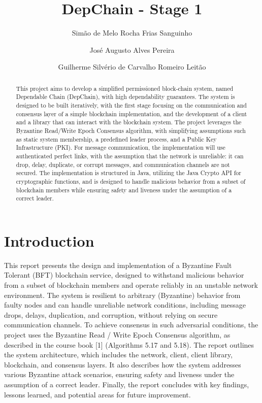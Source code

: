 \documentclass[runningheads]{llncs}
\begin{document}
%
\title{DepChain - Stage 1}
%
%
\author{Simão de Melo Rocha Frias Sanguinho \and José
Augusto Alves Pereira \and Guilherme Silvério de
Carvalho Romeiro Leitão}
%
%
%
\maketitle              %
%
\begin{abstract}
This project aims to develop a simplified permissioned block-chain system, named
Dependable Chain (DepChain), with high dependability guarantees. The system is
designed to be built iteratively, with the first stage focusing on the
communication and consensus layer of a simple blockchain implementation, and the
development of a client and a library that can interact with the blockchain
system. The project leverages the Byzantine Read/Write Epoch Consensus
algorithm, with simplifying assumptions such as static system membership, a
predefined leader process, and a Public Key Infrastructure (PKI). For message
communication, the implementation will use authenticated perfect links, with the
assumption that the  network  is  unreliable:  it  can  drop,  delay, duplicate,
or  corrupt messages, and communication channels are not secured. The
implementation is structured in Java, utilizing the Java Crypto API for
cryptographic functions, and is designed to handle malicious behavior from a
subset of blockchain members while ensuring safety and liveness under the
assumption of a correct leader.
%
\end{abstract}
%
\section{Introduction}
This report presents the design and implementation of a Byzantine Fault Tolerant
(BFT) blockchain service, designed to withstand malicious behavior from a subset
of blockchain members and operate reliably in an unstable network environment.
The system is resilient to arbitrary (Byzantine) behavior from faulty nodes and
can handle unreliable network conditions, including message drops, delays,
duplication, and corruption, without relying on secure communication channels.
To achieve consensus in such adversarial conditions, the project uses the
Byzantine Read / Write Epoch Consensus algorithm, as described in the course
book [1] (Algorithms 5.17 and 5.18). The report outlines the system
architecture, which includes the network, client, client library, blockchain, and
consensus layers. It also describes how the system addresses various Byzantine
attack scenarios, ensuring safety and liveness under the assumption of a correct
leader. Finally, the report concludes with key findings, lessons learned, and
potential areas for future improvement.
%
\end{document}
